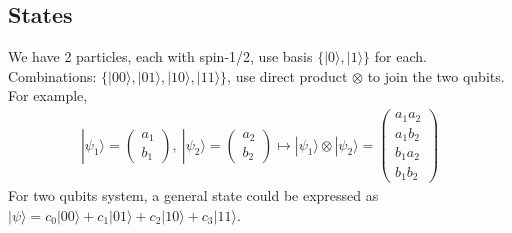 \documentclass[UTF8,12pt]{article} %
\begin{document}
\subsection{States}
We have 2 particles, each with spin-1/2, use basis $\{|0\rangle,|1\rangle\}$ for each. Combinations: $\{|00\rangle,|01\rangle,|10\rangle,|11\rangle\}$, use direct product $\otimes$ to join the two qubits. For example,
\begin{align}
|\psi_1\rangle = \begin{pmatrix}a_1\\b_1\end{pmatrix},~|\psi_2\rangle = \begin{pmatrix}a_2\\b_2\end{pmatrix}\longmapsto |\psi_1\rangle\otimes|\psi_2\rangle = \begin{pmatrix}a_1a_2\\a_1b_2\\b_1a_2\\b_1b_2\end{pmatrix}
\end{align}
For two qubits system, a general state could be expressed as $|\psi\rangle = c_0|00\rangle + c_1|01\rangle + c_2|10\rangle + c_3|11\rangle$.
\end{document}
